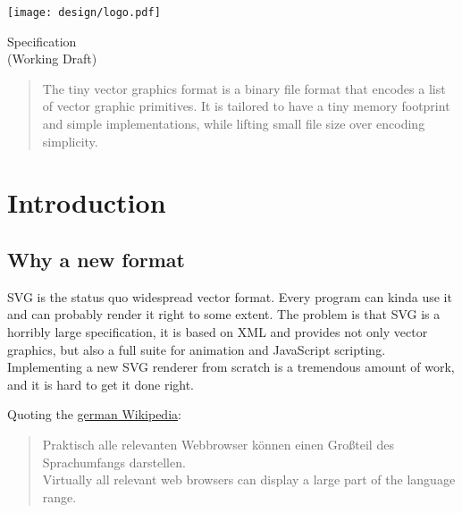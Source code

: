 \documentclass[]{article}
\begin{document}
\begin{titlepage}
  \begin{center}    
    \vspace*{1cm}

    \texttt{[image: design/logo.pdf]}

    \vspace*{1cm}

    \Huge Specification\\
    \vspace{0.5cm}
    \LARGE (Working Draft)
        
    \vfill
        
    \begin{abstract}
    \Large
    The tiny vector graphics format is a binary file
    format that encodes a list of vector graphic primitives. It is tailored
    to have a tiny memory footprint and simple implementations, while
    lifting small file size over encoding simplicity.
    \end{abstract}
        
    \vspace{0.8cm}
  \end{center}
\end{titlepage}

\hypertarget{introduction}{\section{Introduction}\label{introduction}}

\hypertarget{why-a-new-format}{\subsection{Why a new format}\label{why-a-new-format}}

SVG is the status quo widespread vector format. Every program can kinda
use it and can probably render it right to some extent. The problem is
that SVG is a horribly large specification, it is based on XML and
provides not only vector graphics, but also a full suite for animation
and JavaScript scripting. Implementing a new SVG renderer from scratch
is a tremendous amount of work, and it is hard to get it done right.

Quoting the \href{https://de.wikipedia.org/wiki/Scalable_Vector_Graphics}{german Wikipedia}:

\begin{quote}
Praktisch alle relevanten Webbrowser können einen Großteil des
Sprachumfangs darstellen.\\
Virtually all relevant web browsers can display a large part of the
language range.
\end{quote}
\end{document}
